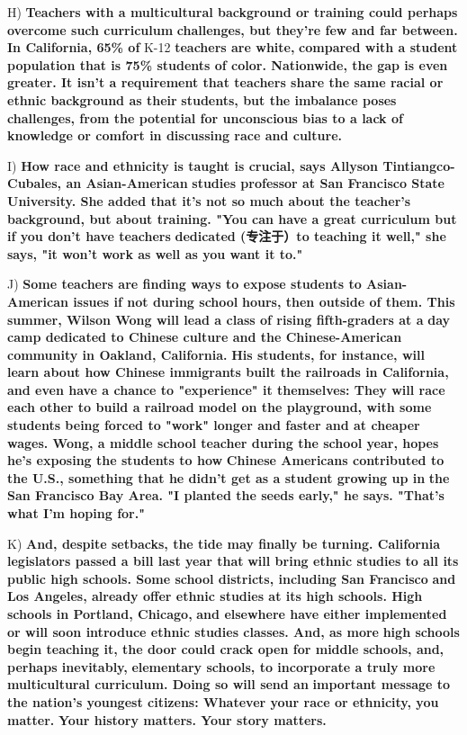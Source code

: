\documentclass[UTF8,11pt]{ctexart}
\begin{document}
H) \textbf{Teachers with a multicultural background or training could perhaps overcome such curriculum} \textbf{challenges, but they're few and far between. In California, 65\% of }K-12 \textbf{teachers are white,} \textbf{compared with a student population that is 75\% students of color. Nationwide, the gap is even} \textbf{greater. It isn't a requirement that teachers share the same racial or ethnic background as their} \textbf{students, but the imbalance poses challenges, from the potential for unconscious bias to a lack of} \textbf{knowledge or comfort in discussing race and culture.}


I) \textbf{How race and ethnicity is taught is crucial, says Allyson Tintiangco-Cubales, an Asian-American} \textbf{studies professor at San Francisco State University. She added that it's not so much about the teacher's} \textbf{background, but about training. "You can have a great curriculum but if you don't have teachers} \textbf{dedicated (专注于）to teaching it well," she says, "it won't work as well as you want it to."}


J) \textbf{Some teachers are finding ways to expose students to Asian-American issues if not during school} \textbf{hours, then outside of them. This summer, Wilson Wong will lead a class of rising fifth-graders at a} \textbf{day camp dedicated to Chinese culture and the Chinese-American community in Oakland, California.} \textbf{His students, for instance, will learn about how Chinese immigrants built the railroads in California,} \textbf{and even have a chance to "experience" it themselves: They will race each other to build a railroad} \textbf{model on the playground, with some students being forced to "work" longer and faster and at cheaper} \textbf{wages. Wong, a middle school teacher during the school year, hopes he's exposing the students to how} \textbf{Chinese Americans contributed to the U.S., something that he didn't get as a student growing up in} \textbf{the San Francisco Bay Area. "I planted the seeds early," he says. "That's what I'm hoping for."}


K) \textbf{And, despite setbacks, the tide may finally be turning. California legislators passed a bill last year that} \textbf{will bring ethnic studies to all its public high schools. Some school districts, including San Francisco} \textbf{and Los Angeles, already offer ethnic studies at its high schools. High schools in Portland, Chicago,} \textbf{and elsewhere have either implemented or will soon introduce ethnic studies classes. And, as more} \textbf{high schools begin teaching it, the door could crack open for middle schools, and, perhaps inevitably,} \textbf{elementary schools, to incorporate a truly more multicultural curriculum. Doing so will send an} \textbf{important message to the nation's youngest citizens: Whatever your race or ethnicity, you matter.} \textbf{Your history matters. Your story matters.}
\end{document}
